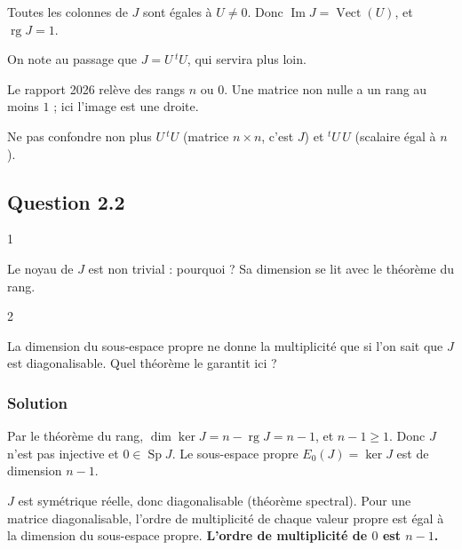 \documentclass[11pt,a4paper]{article}
\begin{document}
Toutes les colonnes de \(J\) sont égales à \(U\neq0\). Donc \(\operatorname{Im}J=\operatorname{Vect}(U)\), et \(\operatorname{rg}J=1\).

On note au passage que \(J=U\,{}^tU\), qui servira plus loin.

\begin{piege}

Le rapport 2026 relève des rangs \(n\) ou \(0\). Une matrice non nulle a un rang au moins \(1\) ; ici l'image est une droite.

Ne pas confondre non plus \(U\,{}^tU\) (matrice \(n\times n\), c'est \(J\)) et \({}^tU\,U\) (scalaire égal à \(n\)).

\end{piege}

\hypertarget{question-2.2}{%
\subsection{Question 2.2}\label{question-2.2}}

\begin{indication}{1}

Le noyau de \(J\) est non trivial : pourquoi ? Sa dimension se lit avec le théorème du rang.

\end{indication}

\begin{indication}{2}

La dimension du sous-espace propre ne donne la multiplicité que si l'on sait que \(J\) est diagonalisable. Quel théorème le garantit ici ?

\end{indication}

\hypertarget{solution-2}{%
\subsubsection{Solution}\label{solution-2}}

Par le théorème du rang, \(\dim\ker J=n-\operatorname{rg}J=n-1\), et \(n-1\ge1\). Donc \(J\) n'est pas injective et \(0\in\operatorname{Sp}J\). Le sous-espace propre \(E_0(J)=\ker J\) est de dimension \(n-1\).

\(J\) est symétrique réelle, donc diagonalisable (théorème spectral). Pour une matrice diagonalisable, l'ordre de multiplicité de chaque valeur propre est égal à la dimension du sous-espace propre. \textbf{L'ordre de multiplicité de \(0\) est \(n-1\).}
\end{document}
